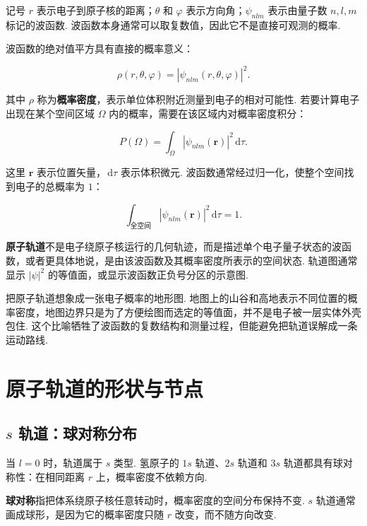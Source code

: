 \documentclass[UTF8,11pt,a4paper,openany]{ctexbook}
\newcommand{\dd}{\,\mathrm d}\newcommand{\Ham}{\hat H}\newcommand{\tr}{\operatorname{Tr}}
\newcommand{\term}[1]{\textbf{#1}}
\begin{document}
\begin{notationbox}
记号 $r$ 表示电子到原子核的距离；$\theta$ 和 $\varphi$ 表示方向角；$\psi_{n l m}$ 表示由量子数 $n,l,m$ 标记的波函数. 波函数本身通常可以取复数值，因此它不是直接可观测的概率. 
\end{notationbox}

波函数的绝对值平方具有直接的概率意义：

\[
\rho(r,\theta,\varphi)=\left|\psi_{n l m}(r,\theta,\varphi)\right|^2.
\]

其中 $\rho$ 称为\term{概率密度}，表示单位体积附近测量到电子的相对可能性. 若要计算电子出现在某个空间区域 $\Omega$ 内的概率，需要在该区域内对概率密度积分：

\[
P(\Omega)=\int_{\Omega}\left|\psi_{n l m}(\mathbf r)\right|^2\dd\tau.
\]

这里 $\mathbf r$ 表示位置矢量，$\dd\tau$ 表示体积微元. 波函数通常经过归一化，使整个空间找到电子的总概率为 $1$：

\[
\int_{\text{全空间}}\left|\psi_{n l m}(\mathbf r)\right|^2\dd\tau=1.
\]

\begin{definitionbox}
\term{原子轨道}不是电子绕原子核运行的几何轨迹，而是描述单个电子量子状态的波函数，或者更具体地说，是由该波函数及其概率密度所表示的空间状态. 轨道图通常显示 $\left|\psi\right|^2$ 的等值面，或显示波函数正负号分区的示意图. 
\end{definitionbox}

\begin{analogybox}
把原子轨道想象成一张电子概率的地形图. 地图上的山谷和高地表示不同位置的概率密度，地图边界只是为了方便绘图而选定的等值面，并不是电子被一层实体外壳包住. 这个比喻牺牲了波函数的复数结构和测量过程，但能避免把轨道误解成一条运动路线. 
\end{analogybox}

\section{原子轨道的形状与节点}

\subsection{$s$ 轨道：球对称分布}

当 $l=0$ 时，轨道属于 $s$ 类型. 氢原子的 $1s$ 轨道、$2s$ 轨道和 $3s$ 轨道都具有球对称性：在相同距离 $r$ 上，概率密度不依赖方向. 

\begin{definitionbox}
\term{球对称}指把体系绕原子核任意转动时，概率密度的空间分布保持不变. $s$ 轨道通常画成球形，是因为它的概率密度只随 $r$ 改变，而不随方向改变. 
\end{definitionbox}
\end{document}
